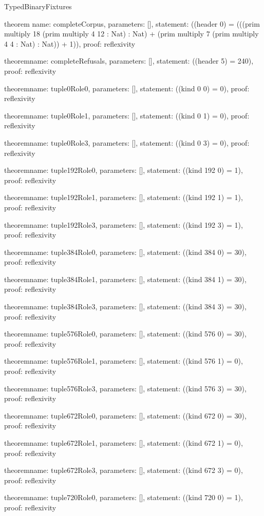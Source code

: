 \begin{lexlean}{TypedBinaryFixtures}
\begin{semanticmodule}
theorem{
  name: completeCorpus,
  parameters: [],
  statement: ((header 0) = (((prim multiply 18 (prim multiply 4 12 : Nat) : Nat) + (prim multiply 7 (prim multiply 4 4 : Nat) : Nat)) + 1)),
  proof: reflexivity{}
}

theorem{name: completeRefusals, parameters: [], statement: ((header 5) = 240), proof: reflexivity{}}

theorem{name: tuple0Role0, parameters: [], statement: ((kind 0 0) = 0), proof: reflexivity{}}

theorem{name: tuple0Role1, parameters: [], statement: ((kind 0 1) = 0), proof: reflexivity{}}

theorem{name: tuple0Role3, parameters: [], statement: ((kind 0 3) = 0), proof: reflexivity{}}

theorem{name: tuple192Role0, parameters: [], statement: ((kind 192 0) = 1), proof: reflexivity{}}

theorem{name: tuple192Role1, parameters: [], statement: ((kind 192 1) = 1), proof: reflexivity{}}

theorem{name: tuple192Role3, parameters: [], statement: ((kind 192 3) = 1), proof: reflexivity{}}

theorem{name: tuple384Role0, parameters: [], statement: ((kind 384 0) = 30), proof: reflexivity{}}

theorem{name: tuple384Role1, parameters: [], statement: ((kind 384 1) = 30), proof: reflexivity{}}

theorem{name: tuple384Role3, parameters: [], statement: ((kind 384 3) = 30), proof: reflexivity{}}

theorem{name: tuple576Role0, parameters: [], statement: ((kind 576 0) = 30), proof: reflexivity{}}

theorem{name: tuple576Role1, parameters: [], statement: ((kind 576 1) = 0), proof: reflexivity{}}

theorem{name: tuple576Role3, parameters: [], statement: ((kind 576 3) = 30), proof: reflexivity{}}

theorem{name: tuple672Role0, parameters: [], statement: ((kind 672 0) = 30), proof: reflexivity{}}

theorem{name: tuple672Role1, parameters: [], statement: ((kind 672 1) = 0), proof: reflexivity{}}

theorem{name: tuple672Role3, parameters: [], statement: ((kind 672 3) = 0), proof: reflexivity{}}

theorem{name: tuple720Role0, parameters: [], statement: ((kind 720 0) = 1), proof: reflexivity{}}


\end{semanticmodule}
\end{lexlean}
